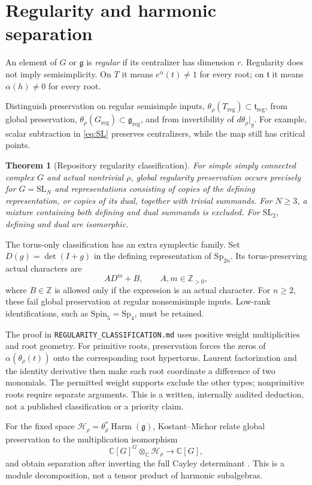 \documentclass[11pt]{article}
\newcommand{\C}{\mathbb C}
\newcommand{\Z}{\mathbb Z}
\newcommand{\g}{\mathfrak g}
\newcommand{\h}{\mathfrak t}
\newcommand{\reg}{\mathrm{reg}}
\newcommand{\Harm}{\operatorname{Harm}}
\newcommand{\record}[1]{{\small\nolinkurl{#1}}}
\newtheorem{theorem}{Theorem}[section]
\begin{document}
\section{Regularity and harmonic separation}

An element of $G$ or $\g$ is \emph{regular} if its centralizer has dimension $r$. Regularity does not imply semisimplicity. On $T$ it means $e^\alpha(t)\ne1$ for every root; on $\h$ it means $\alpha(h)\ne0$ for every root.

Distinguish preservation on regular semisimple inputs,
$\theta_\rho(T_{\reg})\subset\h_{\reg}$, from global preservation,
$\theta_\rho(G_{\reg})\subset\g_{\reg}$, and from invertibility of $d\theta_\rho|_g$. For example, scalar subtraction in \eqref{eq:SL} preserves centralizers, while the map still has critical points.

\begin{theorem}[Repository regularity classification]\label{thm:reg}
For simple simply connected complex $G$ and actual nontrivial $\rho$, global regularity preservation occurs precisely for $G=\mathrm{SL}_N$ and representations consisting of copies of the defining representation, or copies of its dual, together with trivial summands. For $N\ge3$, a mixture containing both defining and dual summands is excluded. For $\mathrm{SL}_2$, defining and dual are isomorphic.
\end{theorem}

The torus-only classification has an extra symplectic family. Set $D(g)=\det(I+g)$ in the defining representation of $\mathrm{Sp}_{2n}$. Its torus-preserving actual characters are
\[
 A D^m+B,\qquad A,m\in\Z_{>0},
\]
where $B\in\Z$ is allowed only if the expression is an actual character. For $n\ge2$, these fail global preservation at regular nonsemisimple inputs. Low-rank identifications, such as $\mathrm{Spin}_5=\mathrm{Sp}_4$, must be retained.

The proof in \record{REGULARITY_CLASSIFICATION.md} uses positive weight multiplicities and root geometry. For primitive roots, preservation forces the zeros of $\alpha(\theta_\rho(t))$ onto the corresponding root hypertorus. Laurent factorization and the identity derivative then make each root coordinate a difference of two monomials. The permitted weight supports exclude the other types; nonprimitive roots require separate arguments. This is a written, internally audited deduction, not a published classification or a priority claim.

For the fixed space $\mathcal H_\rho=\theta_\rho^*\Harm(\g)$, Kostant--Michor relate global preservation to the multiplication isomorphism
\[
 \C[G]^G\otimes_\C\mathcal H_\rho\longrightarrow\C[G],
\]
and obtain separation after inverting the full Cayley determinant \cite[Theorem 3.2]{KM}. This is a module decomposition, not a tensor product of harmonic subalgebras.
\end{document}
